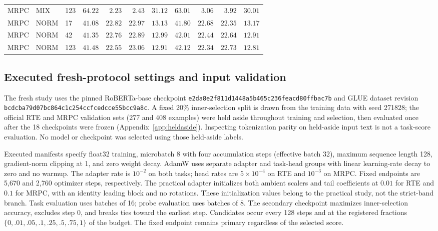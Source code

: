 \documentclass{article}
\begin{document}
\begin{table}[t]
\begin{adjustbox}{max width=\linewidth}
\begin{tabular}{lllrrrrrrrr}
MRPC & MIX & 123 & $64.22$ & $2.23$ & $2.43$ & $31.12$ & $63.01$ & $3.06$ & $3.92$ & $30.01$ \\
MRPC & NORM & 17 & $41.08$ & $22.82$ & $22.97$ & $13.13$ & $41.80$ & $22.68$ & $22.35$ & $13.17$ \\
MRPC & NORM & 42 & $41.35$ & $22.76$ & $22.89$ & $12.99$ & $42.01$ & $22.44$ & $22.64$ & $12.91$ \\
MRPC & NORM & 123 & $41.48$ & $22.55$ & $23.06$ & $12.91$ & $42.12$ & $22.34$ & $22.73$ & $12.81$ \\
\bottomrule
\end{tabular}
\end{adjustbox}
\end{table}

\subsection{Executed fresh-protocol settings and input validation}
\label{app:freshrecipe}
The fresh study uses the pinned RoBERTa-base checkpoint \texttt{e2da8e2f811d1448a5b465c236feacd80ffbac7b} and GLUE dataset revision \texttt{bcdcba79d07bc864c1c254ccfcedcce55bcc9a8c}. A fixed 20\% inner-selection split is drawn from the training data with seed 271828; the official RTE and MRPC validation sets (277 and 408 examples) were held aside throughout training and selection, then evaluated once after the 18 checkpoints were frozen (Appendix~\ref{app:heldaside}). Inspecting tokenization parity on held-aside input text is not a task-score evaluation. No model or checkpoint was selected using those held-aside labels.

Executed manifests specify float32 training, microbatch 8 with four accumulation steps (effective batch 32), maximum sequence length 128, gradient-norm clipping at 1, and zero weight decay. AdamW uses separate adapter and task-head groups with linear learning-rate decay to zero and no warmup. The adapter rate is $10^{-2}$ on both tasks; head rates are $5\times10^{-4}$ on RTE and $10^{-3}$ on MRPC. Fixed endpoints are 5{,}670 and 2{,}760 optimizer steps, respectively. The practical adapter initializes both ambient scalers and tail coefficients at $0.01$ for RTE and $0.1$ for MRPC, with an identity leading block and no rotations. These initialization values belong to the practical study, not the strict-band branch. Task evaluation uses batches of 16; probe evaluation uses batches of 8. The secondary checkpoint maximizes inner-selection accuracy, excludes step 0, and breaks ties toward the earliest step. Candidates occur every 128 steps and at the registered fractions $\{0,.01,.05,.1,.25,.5,.75,1\}$ of the budget. The fixed endpoint remains primary regardless of the selected score.
\end{document}
